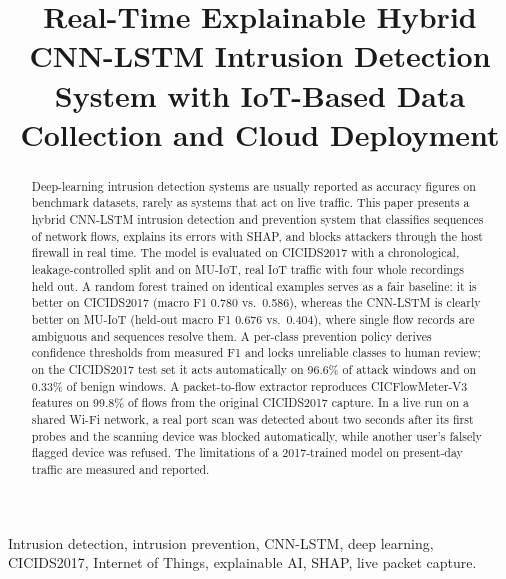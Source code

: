 \documentclass[conference]{IEEEtran}
\begin{document}
\title{Real-Time Explainable Hybrid CNN-LSTM Intrusion Detection System with IoT-Based Data Collection and Cloud Deployment}

\author{%
}

\maketitle

\begin{abstract}
Deep-learning intrusion detection systems are usually reported as accuracy
figures on benchmark datasets, rarely as systems that act on live traffic.
This paper presents a hybrid CNN-LSTM intrusion detection and prevention
system that classifies sequences of network flows, explains its errors with
SHAP, and blocks attackers through the host firewall in real time. The model
is evaluated on CICIDS2017 with a chronological, leakage-controlled split and
on MU-IoT, real IoT traffic with four whole recordings held out. A random
forest trained on identical examples serves as a fair baseline: it is better
on CICIDS2017 (macro F1 0.780 vs.\ 0.586), whereas the CNN-LSTM is clearly
better on MU-IoT (held-out macro F1 0.676 vs.\ 0.404), where single flow
records are ambiguous and sequences resolve them. A per-class prevention
policy derives confidence thresholds from measured F1 and locks unreliable
classes to human review; on the CICIDS2017 test set it acts automatically on
96.6\% of attack windows and on 0.33\% of benign windows. A packet-to-flow
extractor reproduces CICFlowMeter-V3 features on 99.8\% of flows from the
original CICIDS2017 capture. In a live run on a shared Wi-Fi network, a real
port scan was detected about two seconds after its first probes and the
scanning device was blocked automatically, while another user's falsely
flagged device was refused. The limitations of a 2017-trained model on
present-day traffic are measured and reported.
\end{abstract}

\begin{IEEEkeywords}
Intrusion detection, intrusion prevention, CNN-LSTM, deep learning,
CICIDS2017, Internet of Things, explainable AI, SHAP, live packet capture.
\end{IEEEkeywords}
\end{document}
